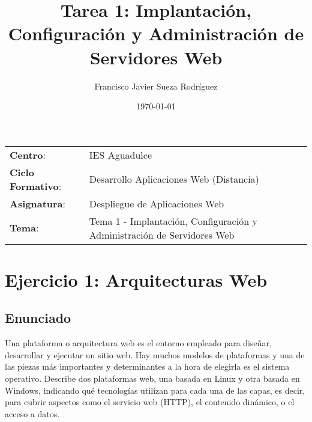 


\title{
\vspace{10ex}
\normalfont \normalsize
\huge \textbf{Tarea 1: Implantación, Configuración y Administración de Servidores Web}
}
\author{Francisco Javier Sueza Rodríguez}
\date{\normalsize\today}



\maketitle

\thispagestyle{empty}

\vspace{68ex}

\begin{center}
    \begin{tabular}{l l}
        \textbf{Centro}: & IES Aguadulce \\
        \textbf{Ciclo Formativo}: & Desarrollo Aplicaciones Web (Distancia)\\
        \textbf{Asignatura}: & Despliegue de Aplicaciones Web\\
        \textbf{Tema}: & Tema 1 -  Implantación, Configuración y Administración de Servidores Web\\
    \end{tabular}
\end{center}

\newpage

\section{Ejercicio 1: Arquitecturas Web}
\subsection{Enunciado}
Una plataforma o arquitectura web es el entorno empleado para diseñar, desarrollar y ejecutar un sitio web. Hay muchos modelos de plataformas y una de las piezas más importantes y determinantes a la hora de elegirla es el sistema operativo. Describe dos plataformas web, una basada en Linux y otra basada en Windows, indicando qué tecnologías utilizan para cada una de las capas, es decir, para cubrir aspectos como el servicio web (HTTP), el contenido dinámico, o el acceso a datos.

